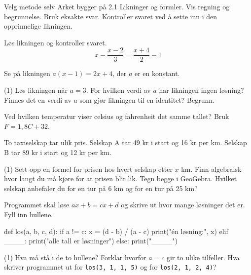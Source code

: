 
\begin{infoboks}{Velg metode selv}
Arket bygger på 2.1 Likninger og formler. Vis regning og begrunnelse. Bruk eksakte svar.
Kontroller svaret ved å sette inn i den opprinnelige likningen.
\end{infoboks}


Løs likningen og kontroller svaret.
\[ x - \frac{x-2}{3} = \frac{x+4}{2} - 1 \]

Se på likningen $a(x-1) = 2x + 4$, der $a$ er en konstant.
\begin{tasks}(1)
  \task Løs likningen når $a = 3$.
  \task For hvilken verdi av $a$ har likningen ingen løsning?
  \task Finnes det en verdi av $a$ som gjør likningen til en identitet? Begrunn.
\end{tasks}

Ved hvilken temperatur viser celsius og fahrenheit det samme tallet? Bruk $F = 1{,}8C + 32$.

To taxiselskap tar ulik pris. Selskap A tar 49 kr i start og 16 kr per km. Selskap B tar 89 kr i start og 12 kr per km.
\begin{tasks}(1)
  \task Sett opp en formel for prisen hos hvert selskap etter $x$ km.
  \task Finn algebraisk hvor langt du må kjøre for at prisen blir lik.
  \task Tegn begge i GeoGebra. Hvilket selskap anbefaler du for en tur på 6 km og for en tur på 25 km?
\end{tasks}

Programmet skal løse $ax + b = cx + d$ og skrive ut hvor mange løsninger det er. Fyll inn hullene.
\begin{kode}
def los(a, b, c, d):
    if a != c:
        x = (d - b) / (a - c)
        print("én løsning:", x)
    elif ____:
        print("alle tall er løsninger")
    else:
        print("____")
\end{kode}
\begin{tasks}(1)
  \task Hva må stå i de to hullene? Forklar hvorfor $a = c$ gir to ulike tilfeller.
  \task Hva skriver programmet ut for \lstinline[style=laereverk,numbers=none,frame=none]|los(3, 1, 1, 5)| og for \lstinline[style=laereverk,numbers=none,frame=none]|los(2, 1, 2, 4)|?
\end{tasks}


